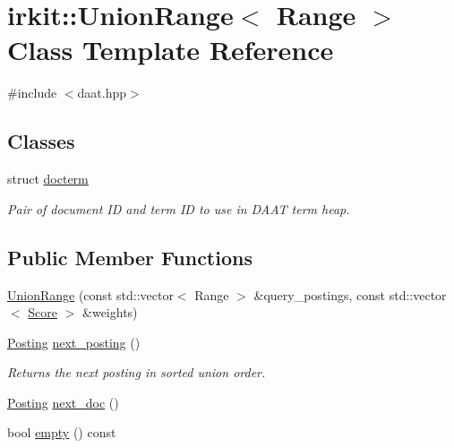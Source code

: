 \hypertarget{classirkit_1_1UnionRange}{}\section{irkit\+:\+:Union\+Range$<$ Range $>$ Class Template Reference}
\label{classirkit_1_1UnionRange}


{\ttfamily \#include $<$daat.\+hpp$>$}

\subsection*{Classes}
\begin{DoxyCompactItemize}
\item 
struct \hyperlink{structirkit_1_1UnionRange_1_1docterm}{docterm}
\begin{DoxyCompactList}\small\item\em Pair of document ID and term ID to use in D\+A\+AT term heap. \end{DoxyCompactList}\end{DoxyCompactItemize}
\subsection*{Public Member Functions}
\begin{DoxyCompactItemize}
\item 
\hyperlink{classirkit_1_1UnionRange_ae37ac22afd534bf0f7c2df98911723f3}{Union\+Range} (const std\+::vector$<$ Range $>$ \&query\+\_\+postings, const std\+::vector$<$ \hyperlink{classirkit_1_1UnionRange_a47fb098a85581f5e33f4203e16245dae}{Score} $>$ \&weights)
\item 
\hyperlink{classirkit_1_1UnionRange_a5f694970419f5a60d7fd41d740556229}{Posting} \hyperlink{classirkit_1_1UnionRange_aedb2ab6f4a5f0b9f57cf2c55214ed42e}{next\+\_\+posting} ()
\begin{DoxyCompactList}\small\item\em Returns the next posting in sorted union order. \end{DoxyCompactList}\item 
\hyperlink{classirkit_1_1UnionRange_a5f694970419f5a60d7fd41d740556229}{Posting} \hyperlink{classirkit_1_1UnionRange_a9161a468e74df4e76cd04104763f7d97}{next\+\_\+doc} ()
\item 
bool \hyperlink{classirkit_1_1UnionRange_af12b028d791c9d9821c17ae30084fa86}{empty} () const
\end{DoxyCompactItemize}
